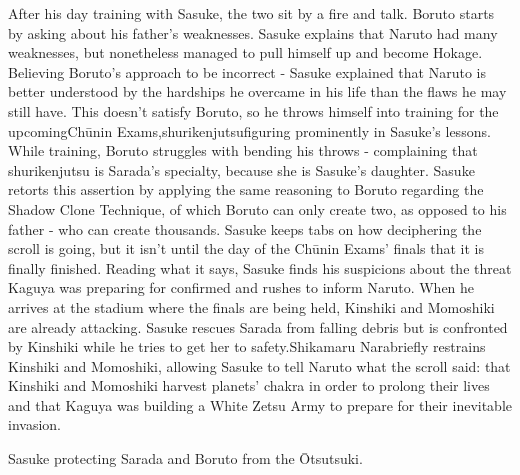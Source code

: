 \documentclass[a4paper,12pt]{article}
\begin{document}
After his day training with Sasuke, the two sit by a fire and talk. Boruto starts by asking about his father's weaknesses. Sasuke explains that Naruto had many weaknesses, but nonetheless managed to pull himself up and become Hokage. Believing Boruto's approach to be incorrect - Sasuke explained that Naruto is better understood by the hardships he overcame in his life than the flaws he may still have. This doesn't satisfy Boruto, so he throws himself into training for the upcomingChūnin Exams,shurikenjutsufiguring prominently in Sasuke's lessons. While training, Boruto struggles with bending his throws - complaining that shurikenjutsu is Sarada's specialty, because she is Sasuke's daughter. Sasuke retorts this assertion by applying the same reasoning to Boruto regarding the Shadow Clone Technique, of which Boruto can only create two, as opposed to his father - who can create thousands. Sasuke keeps tabs on how deciphering the scroll is going, but it isn't until the day of the Chūnin Exams' finals that it is finally finished. Reading what it says, Sasuke finds his suspicions about the threat Kaguya was preparing for confirmed and rushes to inform Naruto. When he arrives at the stadium where the finals are being held, Kinshiki and Momoshiki are already attacking. Sasuke rescues Sarada from falling debris but is confronted by Kinshiki while he tries to get her to safety.Shikamaru Narabriefly restrains Kinshiki and Momoshiki, allowing Sasuke to tell Naruto what the scroll said: that Kinshiki and Momoshiki harvest planets' chakra in order to prolong their lives and that Kaguya was building a White Zetsu Army to prepare for their inevitable invasion.\\ \par \vspace{0.5cm}

Sasuke protecting Sarada and Boruto from the Ōtsutsuki.\\ \par \vspace{0.5cm}
\end{document}
